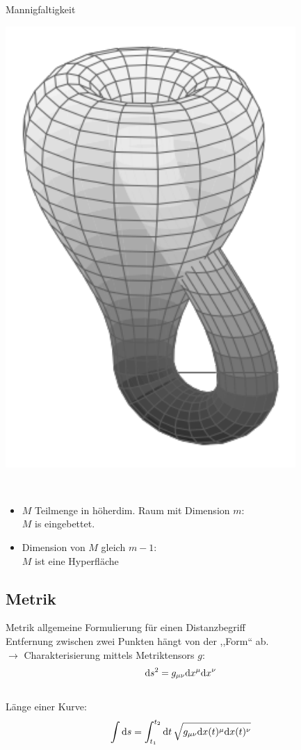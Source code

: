 \documentclass[mathserif]{beamer}
\theoremstyle{definition}
\begin{document}
\begin{frame}{Mannigfaltigkeit}
\begin{minipage}{0.45\linewidth}
			\centering
			\includegraphics[scale=0.3]{bottle.pdf}
		\end{minipage}\\
		\begin{itemize}
			\item $M$ Teilmenge in h\"oherdim. Raum mit Dimension $m$:\\
			$M$ is eingebettet.\\
			\pause
			\item Dimension von $M$ gleich $m-1$:\\
			$M$ ist eine Hyperfl\"ache
		\end{itemize}
	\end{frame}
\subsection{Metrik}
	\begin{frame}{Metrik}
		allgemeine Formulierung für einen Distanzbegriff\\
		Entfernung zwischen zwei Punkten hängt von der ,,Form`` ab.\\
		\pause
		$\rightarrow$ Charakterisierung mittels Metriktensors $g$:
		\begin{align}
			{\rm d}s^2=g_{\mu\nu}{\rm d}x^\mu{\rm d}x^\nu
		\end{align}\\
		Länge einer Kurve:
		\begin{align}
			\int {\rm d}s=\int_{t_1}^{t_2}{\rm d}t\, \sqrt{g_{\mu\nu}{\rm d}x(t)^\mu{\rm d}x(t)^\nu}
		\end{align}
	\end{frame}
	
\end{document}
